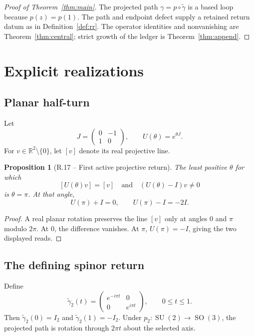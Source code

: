 \documentclass[11pt,letterpaper]{article}
\theoremstyle{returnstyle}
\newtheorem{proposition}[theorem]{Proposition}
\newcommand{\R}{\mathbb{R}}
\newcommand{\SO}{\operatorname{SO}}
\newcommand{\SU}{\operatorname{SU}}
\begin{document}
\begin{proof}[Proof of Theorem~\ref{thm:main}]
The projected path $\gamma=p\circ\widetilde\gamma$ is a based loop because $p(z)=p(1)$.  The path and endpoint defect supply a retained return datum as in Definition~\ref{def:rr}.  The operator identities and nonvanishing are Theorem~\ref{thm:central}; strict growth of the ledger is Theorem~\ref{thm:append}.
\end{proof}

\section{Explicit realizations}\label{sec:realizations}

\subsection{Planar half-turn}

Let
\[
J=\begin{pmatrix}0&-1\\1&0\end{pmatrix},
\qquad
U(\theta)=e^{\theta J}.
\]
For $v\in\R^2\setminus\{0\}$, let $[v]$ denote its real projective line.

\begin{proposition}[R.17 -- First active projective return]\label{prop:halfturn}
The least positive $\theta$ for which
\[
[U(\theta)v]=[v]
\quad\text{and}\quad
(U(\theta)-I)v\ne0
\]
is $\theta=\pi$.  At that angle,
\[
U(\pi)+I=0,
\qquad
U(\pi)-I=-2I.
\]
\end{proposition}

\begin{proof}
A real planar rotation preserves the line $[v]$ only at angles $0$ and $\pi$ modulo $2\pi$.  At $0$, the difference vanishes.  At $\pi$, $U(\pi)=-I$, giving the two displayed reads.
\end{proof}

\subsection{The defining spinor return}

Define
\[
\widetilde\gamma_2(t)=
\begin{pmatrix}
 e^{-i\pi t}&0\\
 0&e^{i\pi t}
\end{pmatrix},
\qquad 0\le t\le1.
\]
Then $\widetilde\gamma_2(0)=I_2$ and $\widetilde\gamma_2(1)=-I_2$.  Under $p_2:\SU(2)\to\SO(3)$, the projected path is rotation through $2\pi t$ about the selected axis.
\end{document}
